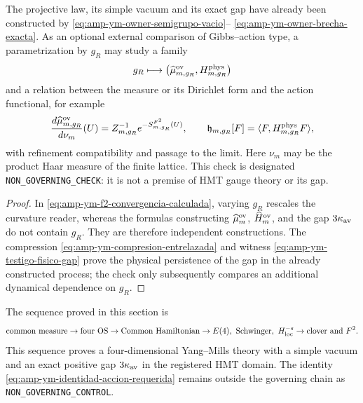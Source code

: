\begin{proposition}
\label{prop:amp-ym-puente-accion-requerido}
The projective law, its simple vacuum and its exact gap have already been constructed
by \eqref{eq:amp-ym-owner-semigrupo-vacio}--
\eqref{eq:amp-ym-owner-brecha-exacta}. As an optional external comparison of
Gibbs--action type, a parametrization by \(g_R\) may study a family
\[
 g_R\longmapsto
 \bigl(\widehat\mu_{m,g_R}^{\rm ov},H_{m,g_R}^{\rm phys}\bigr)
\]
and a relation between the measure or its Dirichlet form and the action
functional, for example
\begin{equation}\label{eq:amp-ym-identidad-accion-requerida}
 \frac{d\widehat\mu_{m,g_R}^{\rm ov}}{d\nu_m}(U)
 =Z_{m,g_R}^{-1}e^{-S_{m,g_R}^{F^2}(U)},
 \qquad
 \mathfrak h_{m,g_R}[F]
 =\langle F,H_{m,g_R}^{\rm phys}F\rangle,
\end{equation}
with refinement compatibility and passage to the limit. Here \(\nu_m\) may
be the product Haar measure of the finite lattice. This check is designated
\texttt{NON\_GOVERNING\_CHECK}: it is not a premise of HMT gauge theory or
its gap.
\end{proposition}

\begin{proof}
In \eqref{eq:amp-ym-f2-convergencia-calculada}, varying \(g_R\) rescales the
curvature reader, whereas the formulas constructing
\(\widehat\mu_m^{\rm ov}\), \(\widehat H_m^{\rm ov}\), and the gap
\(3\kappa_{\rm av}\) do not contain \(g_R\). They are therefore independent
constructions. The compression
\eqref{eq:amp-ym-compresion-entrelazada} and witness
\eqref{eq:amp-ym-testigo-fisico-gap} prove the physical persistence of the
gap in the already constructed process; the check only subsequently compares an
additional dynamical dependence on \(g_R\).
\end{proof}

The sequence proved in this section is
\[
 \text{common measure}\to\text{four OS}\to\text{Common Hamiltonian}
 \to E(4),\ \text{Schwinger},\ H^{-s}_{\rm loc}
 \to\text{clover and }F^2.
\]
This sequence proves a four-dimensional Yang--Mills theory with a simple
vacuum and an exact positive gap \(3\kappa_{\rm av}\) in the registered HMT
domain. The identity
\eqref{eq:amp-ym-identidad-accion-requerida} remains outside the governing
chain as \texttt{NON\_GOVERNING\_CONTROL}.
